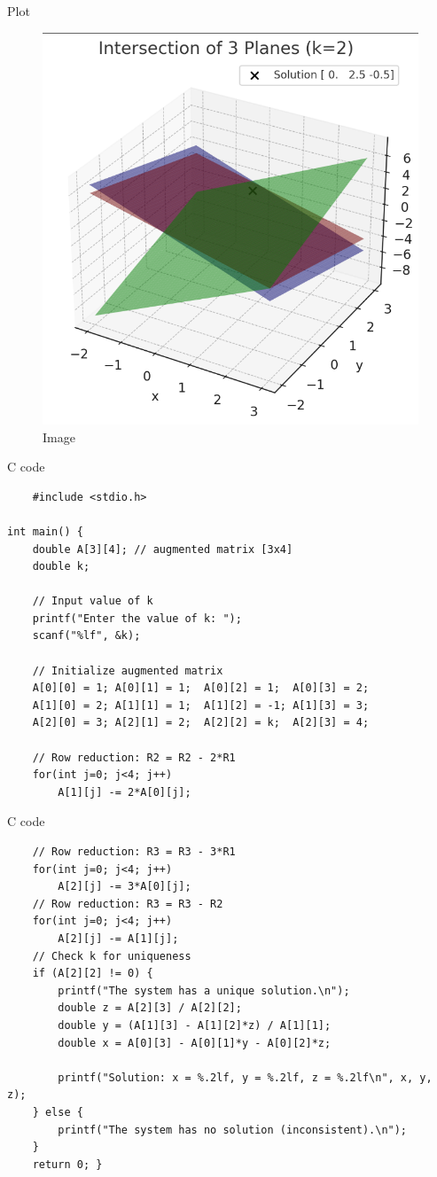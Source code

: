 \documentclass{beamer}
\begin{document}
\begin{frame}{Plot}
    \begin{figure}
        \centering
        \includegraphics[width=0.75\linewidth]{figs/image.png}
        \caption{Image}
        \label{fig:placeholder}
\end{figure}
\end{frame}

\begin{frame}[fragile]{C code}
\begin{lstlisting}
    #include <stdio.h>

int main() {
    double A[3][4]; // augmented matrix [3x4]
    double k;

    // Input value of k
    printf("Enter the value of k: ");
    scanf("%lf", &k);

    // Initialize augmented matrix
    A[0][0] = 1; A[0][1] = 1;  A[0][2] = 1;  A[0][3] = 2;
    A[1][0] = 2; A[1][1] = 1;  A[1][2] = -1; A[1][3] = 3;
    A[2][0] = 3; A[2][1] = 2;  A[2][2] = k;  A[2][3] = 4;

    // Row reduction: R2 = R2 - 2*R1
    for(int j=0; j<4; j++)
        A[1][j] -= 2*A[0][j];
\end{lstlisting}
\end{frame}

\begin{frame}[fragile]{C code}
\begin{lstlisting}
    // Row reduction: R3 = R3 - 3*R1
    for(int j=0; j<4; j++)
        A[2][j] -= 3*A[0][j];
    // Row reduction: R3 = R3 - R2
    for(int j=0; j<4; j++)
        A[2][j] -= A[1][j];
    // Check k for uniqueness
    if (A[2][2] != 0) {
        printf("The system has a unique solution.\n");
        double z = A[2][3] / A[2][2];
        double y = (A[1][3] - A[1][2]*z) / A[1][1];
        double x = A[0][3] - A[0][1]*y - A[0][2]*z;

        printf("Solution: x = %.2lf, y = %.2lf, z = %.2lf\n", x, y, z);
    } else {
        printf("The system has no solution (inconsistent).\n");
    }
    return 0; }
\end{lstlisting}
\end{frame}
\end{document}
